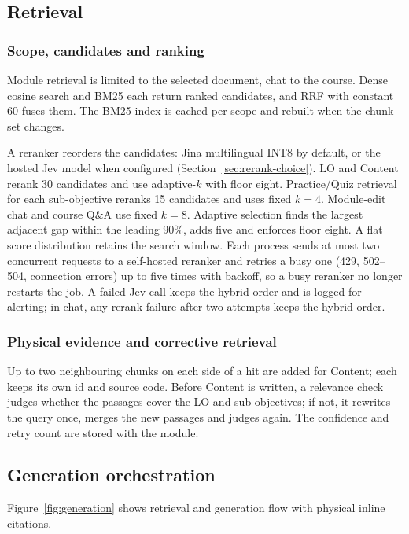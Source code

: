 \subsection{Retrieval}
\subsubsection{Scope, candidates and ranking}\label{sec:retrieval-policy}
Module retrieval is limited to the selected document, chat to the course. Dense cosine search and BM25 each return ranked candidates, and RRF with constant 60 fuses them\citep{bm25,rrf}. The BM25 index is cached per scope and rebuilt when the chunk set changes.

A reranker reorders the candidates: Jina multilingual INT8 by default, or the hosted Jev model when configured (Section~\ref{sec:rerank-choice}). LO and Content rerank 30 candidates and use adaptive-$k$ with floor eight. Practice/Quiz retrieval for each sub-objective reranks 15 candidates and uses fixed $k=4$. Module-edit chat and course Q\&A use fixed $k=8$. Adaptive selection finds the largest adjacent gap within the leading 90\%, adds five and enforces floor eight\citep{adaptive}. A flat score distribution retains the search window. Each process sends at most two concurrent requests to a self-hosted reranker and retries a busy one (429, 502--504, connection errors) up to five times with backoff, so a busy reranker no longer restarts the job. A failed Jev call keeps the hybrid order and is logged for alerting; in chat, any rerank failure after two attempts keeps the hybrid order.
\subsubsection{Physical evidence and corrective retrieval}
Up to two neighbouring chunks on each side of a hit are added for Content; each keeps its own id and source code. Before Content is written, a relevance check judges whether the passages cover the LO and sub-objectives; if not, it rewrites the query once, merges the new passages and judges again\citep{correctiverag}. The confidence and retry count are stored with the module.
\subsection{Generation orchestration}\label{sec:generation}
Figure~\ref{fig:generation} shows retrieval and generation flow with physical inline citations.
